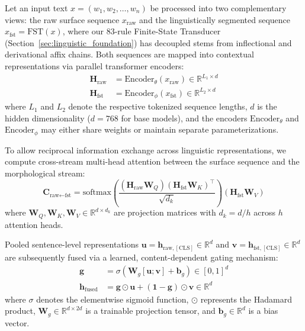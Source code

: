Let an input text $x = (w_1, w_2, \dots, w_n)$ be processed into two complementary views: the raw surface sequence $x_{\text{raw}}$ and the linguistically segmented sequence $x_{\text{fst}} = \mathrm{FST}(x)$, where our 83-rule Finite-State Transducer (Section~\ref{sec:linguistic_foundation}) has decoupled stems from inflectional and derivational affix chains. Both sequences are mapped into contextual representations via parallel transformer encoders:
\begin{align}
\label{eq:encoder_streams}
\mathbf{H}_{\text{raw}} &= \mathrm{Encoder}_{\theta}(x_{\text{raw}}) \in \mathbb{R}^{L_1 \times d} \\
\mathbf{H}_{\text{fst}} &= \mathrm{Encoder}_{\phi}(x_{\text{fst}}) \in \mathbb{R}^{L_2 \times d}
\end{align}
where $L_1$ and $L_2$ denote the respective tokenized sequence lengths, $d$ is the hidden dimensionality ($d = 768$ for base models), and the encoders $\mathrm{Encoder}_{\theta}$ and $\mathrm{Encoder}_{\phi}$ may either share weights or maintain separate parameterizations.

To allow reciprocal information exchange across linguistic representations, we compute cross-stream multi-head attention between the surface sequence and the morphological stream:
\begin{equation}
\label{eq:cross_stream_attn}
\mathbf{C}_{\text{raw} \leftarrow \text{fst}} = \mathrm{softmax}\left(\frac{(\mathbf{H}_{\text{raw}} \mathbf{W}_Q) (\mathbf{H}_{\text{fst}} \mathbf{W}_K)^{\top}}{\sqrt{d_k}}\right) (\mathbf{H}_{\text{fst}} \mathbf{W}_V)
\end{equation}
where $\mathbf{W}_Q, \mathbf{W}_K, \mathbf{W}_V \in \mathbb{R}^{d \times d_k}$ are projection matrices with $d_k = d / h$ across $h$ attention heads.

Pooled sentence-level representations $\mathbf{u} = \mathbf{h}_{\text{raw}, [\text{CLS}]} \in \mathbb{R}^d$ and $\mathbf{v} = \mathbf{h}_{\text{fst}, [\text{CLS}]} \in \mathbb{R}^d$ are subsequently fused via a learned, content-dependent gating mechanism:
\begin{align}
\label{eq:gating_equation}
\mathbf{g} &= \sigma\left(\mathbf{W}_g [\mathbf{u}; \mathbf{v}] + \mathbf{b}_g\right) \in [0, 1]^d \\
\label{eq:fused_representation}
\mathbf{h}_{\text{fused}} &= \mathbf{g} \odot \mathbf{u} + (\mathbf{1} - \mathbf{g}) \odot \mathbf{v} \in \mathbb{R}^d
\end{align}
where $\sigma$ denotes the elementwise sigmoid function, $\odot$ represents the Hadamard product, $\mathbf{W}_g \in \mathbb{R}^{d \times 2d}$ is a trainable projection tensor, and $\mathbf{b}_g \in \mathbb{R}^d$ is a bias vector. 

